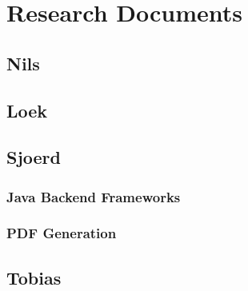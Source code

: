 \chapter{Research Documents}

\section{Nils}


\section{Loek}



\section{Sjoerd}

\subsection{Java Backend Frameworks}


\subsection{PDF Generation}



\section{Tobias}


